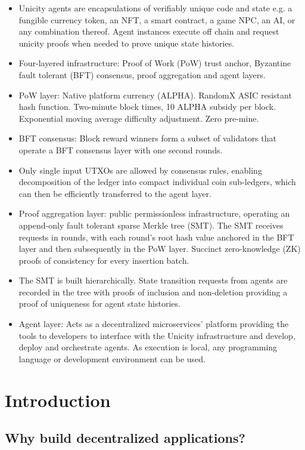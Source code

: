 \documentclass{article}
\begin{document}
\begin{itemize}
    \item Unicity agents are encapsulations of verifiably unique code and state e.g. a fungible currency token, an NFT, a smart contract,  a game NPC, an AI, or any combination thereof. Agent instances execute off chain and request unicity proofs when needed to prove unique state histories.
    \item Four-layered infrastructure: Proof of Work (PoW) trust anchor, Byzantine fault tolerant (BFT) consensus, proof aggregation and agent layers.
    \item PoW layer: Native platform currency (ALPHA). RandomX ASIC resistant hash function. Two-minute block times, 10 ALPHA subsidy per block. Exponential moving average difficulty adjustment. Zero pre-mine.
    \item BFT consensus: Block reward winners form a subset of validators that operate a BFT consensus layer with one second rounds.
    \item Only single input UTXOs are allowed by consensus rules, enabling decomposition of the ledger into compact individual coin sub-ledgers, which can then be efficiently transferred to the agent layer.
    \item Proof aggregation layer: public permissionless infrastructure, operating an append-only fault tolerant sparse Merkle tree (SMT). The SMT receives requests in rounds, with each round's root hash value anchored in the BFT layer and then subsequently in the PoW layer. Succinct zero-knowledge (ZK) proofs of consistency for every insertion batch.
    \item The SMT is built hierarchically. State transition requests from agents are recorded in the tree with proofs of inclusion and non-deletion providing a proof of uniqueness for agent state histories.
    \item Agent layer: Acts as a decentralized microservices' platform providing the tools to developers to interface with the Unicity infrastructure and develop, deploy and orchestrate agents. As execution is local, any programming language or development environment can be used.
\end{itemize}


\section{Introduction}

\subsection{Why build decentralized applications?}
\end{document}
